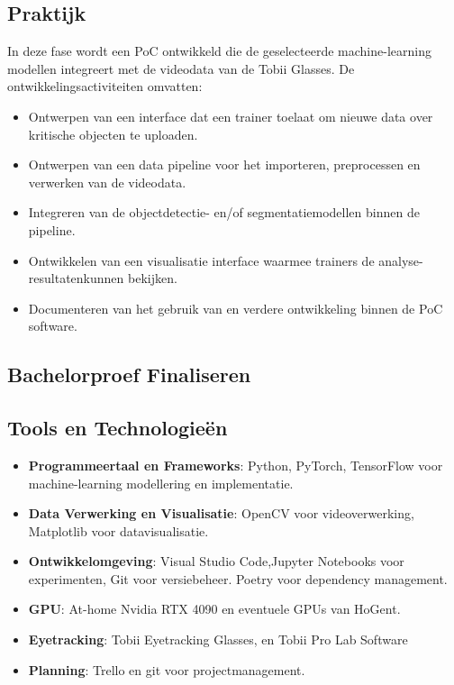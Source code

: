 \subsection{Praktijk}

In deze fase wordt een PoC ontwikkeld die de geselecteerde machine-learning modellen integreert met de videodata van de Tobii Glasses. 
De ontwikkelingsactiviteiten omvatten: 
\begin{itemize} 
  \item Ontwerpen van een interface dat een trainer toelaat om nieuwe data over kritische objecten te uploaden.
  \item Ontwerpen van een data pipeline voor het importeren, preprocessen en verwerken van de videodata. 
  \item Integreren van de objectdetectie- en/of segmentatiemodellen binnen de pipeline.
  \item Ontwikkelen van een visualisatie interface waarmee trainers de analyse-resultaten\newline kunnen bekijken.
  \item Documenteren van het gebruik van en verdere ontwikkeling binnen de PoC software.
\end{itemize}

\subsection{Bachelorproef Finaliseren}

\subsection{Tools en Technologieën}

\begin{itemize} 
  \item \textbf{Programmeertaal en Frameworks}: Python, PyTorch, TensorFlow voor machine-learning modellering en implementatie. 
  \item \textbf{Data Verwerking en Visualisatie}: OpenCV voor videoverwerking, Matplotlib voor datavisualisatie. 
  \item \textbf{Ontwikkelomgeving}: Visual Studio Code,\newline Jupyter Notebooks voor experimenten, Git voor versiebeheer. Poetry voor dependency management.
  \item \textbf{GPU}: At-home Nvidia RTX 4090 en eventuele GPUs van HoGent.
  \item \textbf{Eyetracking}: Tobii Eyetracking Glasses, en Tobii Pro Lab Software
  \item \textbf{Planning}: Trello en git voor projectmanagement.
\end{itemize}

